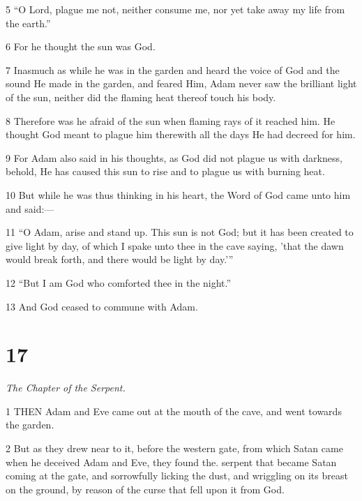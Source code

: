 \par 5 “O Lord, plague me not, neither consume me, nor yet take away my life from the earth.”

\par 6 For he thought the sun was God.

\par 7 Inasmuch as while he was in the garden and heard the voice of God and the sound He made in the garden, and feared Him, Adam never saw the brilliant light of the sun, neither did the flaming heat thereof touch his body.

\par 8 Therefore was he afraid of the sun when flaming rays of it reached him. He thought God meant to plague him therewith all the days He had decreed for him.

\par 9 For Adam also said in his thoughts, as God did not plague us with darkness, behold, He has caused this sun to rise and to plague us with burning heat.

\par 10 But while he was thus thinking in his heart, the Word of God came unto him and said:—

\par 11 “O Adam, arise and stand up. This sun is not God; but it has been created to give light by day, of which I spake unto thee in the cave saying, 'that the dawn would break forth, and there would be light by day.'”

\par 12 “But I am God who comforted thee in the night.”

\par 13 And God ceased to commune with Adam.



\chapter{17}

\par \textit{The Chapter of the Serpent.}

\par 1 THEN Adam and Eve came out at the mouth of the cave, and went towards the garden.

\par 2 But as they drew near to it, before the western gate, from which Satan came when he deceived Adam and Eve, they found the. serpent that became Satan coming at the gate, and sorrowfully licking the dust, and wriggling on its breast on the ground, by reason of the curse that fell upon it from God.

